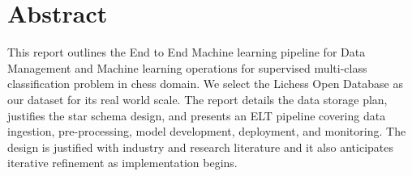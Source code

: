 \documentclass[11pt,a4paper]{report}
\begin{document}

\hypersetup{pageanchor=false}

\hypersetup{pageanchor=true}
\cleardoublepage

\chapter*{Abstract}
{}
 
This report outlines the End to End Machine learning pipeline for Data Management and Machine learning operations for supervised multi-class classification problem in chess domain.
We select the Lichess Open Database as our dataset for its real world scale. The report details the data storage plan, justifies the star schema design, and presents an ELT pipeline covering data ingestion, pre-processing, model development, deployment, and monitoring. The design is justified with industry and research literature and it also anticipates iterative refinement as implementation begins.




\end{document}
